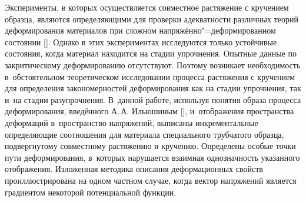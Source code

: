 





\maketitle



 Эксперименты, в которых осуществляется совместное растяжение с кручением образца, являются определяющими для проверки адекватности различных теорий деформирования материалов при сложном напряжённо"=деформированном состоянии []. Однако в этих экспериментах исследуются только устойчивые состояния, когда материал находится на стадии упрочнения. Опытные данные по закритическому деформированию отсутствуют. Поэтому возникает необходимость в~обстоятельном теоретическом исследовании процесса растяжения с кручением для определения закономерностей деформирования как на стадии упрочнения, так и~на стадии разупрочнения. В~данной работе, используя понятия образа процесса деформирования, введённого А.\,А. Ильюшиным [], и~отображения пространства деформаций в~пространство напряжений, выписаны инкрементальные определяющие соотношения для материала специального трубчатого образца, подвергнутому совместному растяжению и кручению. Определены особые точки пути деформирования, в~которых нарушается взаимная однозначность указанного отображения. Изложенная методика описания деформационных свойств проиллюстрирована на одном частном случае, когда вектор напряжений является градиентом некоторой потенциальной функции.



